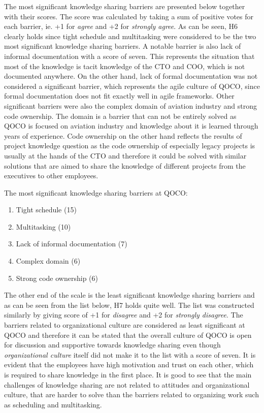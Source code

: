 The most significant knowledge sharing barriers are presented below together with their scores. The score was calculated by taking a sum of positive votes for each barrier, ie.
+1 for \emph{agree} and +2 for \emph{strongly agree}. As can be seen, H6 clearly holds since tight schedule and multitasking were considered to be the two most significant
knowledge sharing barriers. A notable barrier is also lack of informal documentation with a score of seven. This represents the situation that most of the knowledge is tacit
knowledge of the CTO and COO, which is not documented anywhere. On the other hand, lack of formal documentation was not considered a significant barrier, which represents
the agile culture of QOCO, since formal documentation does not fit exactly well in agile frameworks. Other significant barriers were also the complex domain of aviation industry and
strong code ownership. The domain is a barrier that can not be entirely solved as QOCO is focused on aviation industry and knowledge about it is learned through years of experience.
Code ownership on the other hand reflects the results of project knowledge question as the code ownership of especially legacy projects is usually at the hands of the CTO and therefore
it could be solved with similar solutions that are aimed to share the knowledge of different projects from the executives to other employees.

\begin{center}
	The most significant knowledge sharing barriers at QOCO:
	
	\begin{enumerate}
		\centering
		\item Tight schedule (15)
		\item Multitasking (10)
		\item Lack of informal documentation (7)
		\item Complex domain (6)
		\item Strong code ownership (6)
	\end{enumerate}
\end{center}

The other end of the scale is the least significant knowledge sharing barriers and as can be seen from the list below, H7 holds quite well. The list was constructed
similarly by giving score of +1 for \emph{disagree} and +2 for \emph{strongly disagree}. The barriers related to
organizational culture are considered as least significant at QOCO and therefore it can be stated that the overall culture of QOCO is open for discussion and supportive towards
knowledge sharing even though \emph{organizational culture} itself did not make it to the list with a score of seven. It is evident that the employees have high motivation and
trust on each other, which is required to share knowledge in the first place. It is good to see that the main challenges of knowledge sharing are not related to attitudes and
organizational culture, that are harder to solve than the barriers related to organizing work such as scheduling and multitasking.


